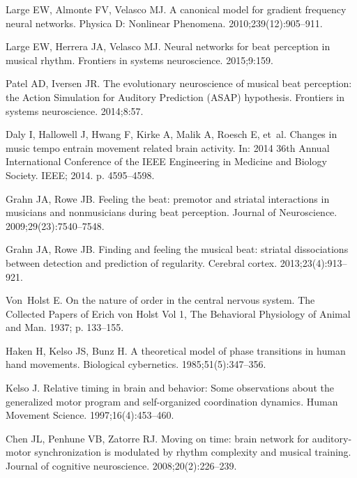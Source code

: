 \documentclass[10pt,letterpaper]{article}
\begin{document}
\begin{thebibliography}{10}
Large EW, Almonte FV, Velasco MJ.
\newblock A canonical model for gradient frequency neural networks.
\newblock Physica D: Nonlinear Phenomena. 2010;239(12):905--911.

Large EW, Herrera JA, Velasco MJ.
\newblock Neural networks for beat perception in musical rhythm.
\newblock Frontiers in systems neuroscience. 2015;9:159.

Patel AD, Iversen JR.
\newblock The evolutionary neuroscience of musical beat perception: the Action
  Simulation for Auditory Prediction (ASAP) hypothesis.
\newblock Frontiers in systems neuroscience. 2014;8:57.

Daly I, Hallowell J, Hwang F, Kirke A, Malik A, Roesch E, et~al.
\newblock Changes in music tempo entrain movement related brain activity.
\newblock In: 2014 36th Annual International Conference of the IEEE Engineering
  in Medicine and Biology Society. IEEE; 2014. p. 4595--4598.

Grahn JA, Rowe JB.
\newblock Feeling the beat: premotor and striatal interactions in musicians and
  nonmusicians during beat perception.
\newblock Journal of Neuroscience. 2009;29(23):7540--7548.

Grahn JA, Rowe JB.
\newblock Finding and feeling the musical beat: striatal dissociations between
  detection and prediction of regularity.
\newblock Cerebral cortex. 2013;23(4):913--921.

Von~Holst E.
\newblock On the nature of order in the central nervous system.
\newblock The Collected Papers of Erich von Holst Vol 1, The Behavioral
  Physiology of Animal and Man. 1937; p. 133--155.

Haken H, Kelso JS, Bunz H.
\newblock A theoretical model of phase transitions in human hand movements.
\newblock Biological cybernetics. 1985;51(5):347--356.

Kelso J.
\newblock Relative timing in brain and behavior: Some observations about the
  generalized motor program and self-organized coordination dynamics.
\newblock Human Movement Science. 1997;16(4):453--460.

Chen JL, Penhune VB, Zatorre RJ.
\newblock Moving on time: brain network for auditory-motor synchronization is
  modulated by rhythm complexity and musical training.
\newblock Journal of cognitive neuroscience. 2008;20(2):226--239.


\end{thebibliography}
\end{document}
